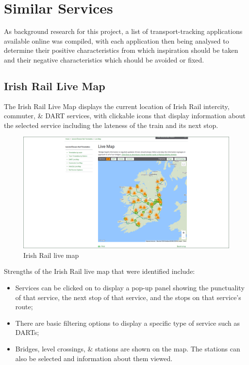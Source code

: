 \documentclass[a4paper,11pt]{report}
\begin{document}
\section{Similar Services}
As background research for this project, a list of transport-tracking applications available online was compiled, with each application then being analysed to determine their positive characteristics from which inspiration should be taken and their negative characteristics which should be avoided or fixed.

\subsection{Irish Rail Live Map}
The Irish Rail Live Map\supercite{liveir} displays the current location of Irish Rail intercity, commuter, \& DART services, with clickable icons that display information about the selected service including the lateness of the train and its next stop.
\begin{figure}[H]
    \centering
    \includegraphics[width=\textwidth]{../PDD/images/irlive.png}
    \caption{Irish Rail live map}
\end{figure}

Strengths of the Irish Rail live map that were identified include:
\begin{itemize}
    \item   Services can be clicked on to display a pop-up panel showing the punctuality of that service, the next stop of that service, and the stops on that service's route;
    \item   There are basic filtering options to display a specific type of service such as DARTs;
    \item   Bridges, level crossings, \& stations are shown on the map.
            The stations can also be selected and information about them viewed.
\end{itemize}
\end{document}
